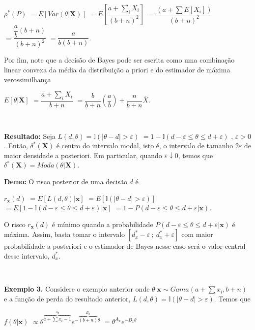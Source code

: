 \documentclass[
]{book}
\begin{document}
\(\rho^*(P)\) \(=E\left[Var(\theta|\boldsymbol X)\right]\) \(=E\left[\dfrac{a+\sum_iX_i}{(b+n)^2}\right]\) \(= \dfrac{\left(a+\sum E[X_i]\right)}{(b+n)^2}\) \(=\dfrac{\dfrac{a}{b}\left(b+n\right)}{(b+n)^2}\) \(=\dfrac{a}{b(b+n)}\).

Por fim, note que a decisão de Bayes pode ser escrita como uma combinação linear convexa da média da distribuição a priori e do estimador de máxima verossimilhança

\(E[\theta|\boldsymbol X]\) \(=\dfrac{a+\sum_iX_i}{b+n}\) \(=\dfrac{b}{b+n}\left(\dfrac{a}{b}\right)+\dfrac{n}{b+n}\bar{X}\).

\(~\)

\textbf{Resultado:} Seja \(L(d,\theta)=\mathbb{I}(|\theta-d|> \varepsilon)\) \(=1-\mathbb{I}(d-\varepsilon\leq \theta \leq d+\varepsilon)\) , \(\varepsilon > 0\).
Então, \(\delta^*(\boldsymbol X)\) é centro do intervalo modal, isto é, o intervalo de tamanho \(2\varepsilon\) de maior densidade a posteriori. Em particular, quando \(\varepsilon \downarrow 0\), temos que \({\delta}^*(\boldsymbol X)=Moda(\theta|\boldsymbol X)\).

\textbf{Demo:} O risco posterior de uma decisão \(d\) é

\(r_{\boldsymbol{x}}(d)\) \(=E\left[L(d,\theta)|\boldsymbol{x}\right]\) \(=E\left[\mathbb{I}(|\theta-d|> \varepsilon)\right]\) \(=E\left[1-\mathbb{I}(d-\varepsilon\leq \theta \leq d+\varepsilon)|\boldsymbol x\right]\) \(=1-P(d-\varepsilon\leq \theta \leq d+\varepsilon|\boldsymbol x)\).

O risco \(r_{\boldsymbol{x}}(d)\) é mínimo quando a probabilidade \(P(d-\varepsilon\leq \theta \leq d+\varepsilon|\boldsymbol x)\) é máxima. Assim, basta tomar o intervalo \(\left[{d}_x^*-\varepsilon ~;~ {d}_x^*+\varepsilon\right]\) com maior probabilidade a posteriori e o estimador de Bayes nesse caso será o valor central desse intervalo, \({d}_x^*\).

\(~\)

\textbf{Exemplo 3.} Considere o exemplo anterior onde \(\theta|\boldsymbol x\sim Gama(a+\sum x_i,b+n)\) e a função de perda do resultado anterior, \(L(d,\theta)=\mathbb{I}(|\theta-d|> \varepsilon)\). Temos que

\(f(\theta|\boldsymbol x)\) \(\propto \theta^{\overbrace{a+\sum x_i-1}^{A_x}}e^{-\overbrace{(b+n)}^{B_x}\theta}\) \(=\theta^{A_x}e^{-{B_x}\theta}\)
\end{document}
